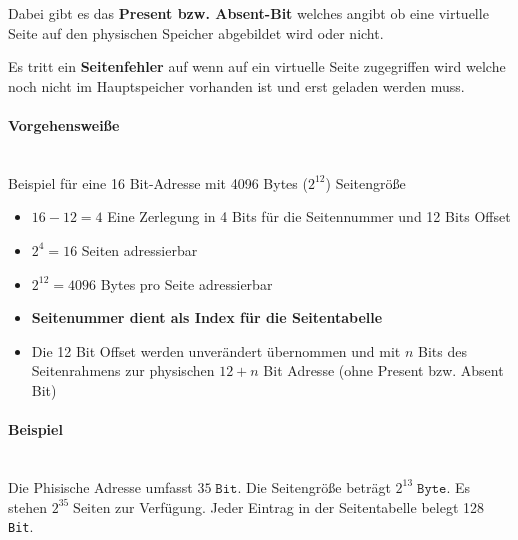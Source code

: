 \documentclass[10pt,a4paper]{article}
\begin{document}
\begin{multicols*}{4}
Dabei gibt es das \textbf{Present bzw. Absent-Bit} welches angibt ob eine virtuelle Seite auf den physischen Speicher
abgebildet wird oder nicht.

Es tritt ein \textbf{Seitenfehler} auf wenn auf ein virtuelle Seite zugegriffen wird welche noch nicht im Hauptspeicher
vorhanden ist und erst geladen werden muss.

\paragraph{Vorgehensweiße}\hfill\\
Beispiel für eine 16 Bit-Adresse mit 4096 Bytes (\(2^{12}\)) Seitengröße
\begin{itemize}
	\item \(16 - 12 = 4\) Eine Zerlegung in 4 Bits für die Seitennummer und 12 Bits Offset
	\item \(2^{4} = 16\) Seiten adressierbar
	\item \(2^{12} = 4096\) Bytes pro Seite adressierbar
	\item \textbf{Seitenummer dient als Index für die Seitentabelle}
	\item Die 12 Bit Offset werden unverändert übernommen und mit \(n\) Bits des Seitenrahmens zur physischen \(12 + n\)
	      Bit Adresse (ohne Present bzw. Absent Bit)
\end{itemize}

\paragraph{Beispiel}\hfill\\
Die Phisische Adresse umfasst \(35\;\texttt{Bit}\). Die Seitengröße beträgt \(2^{13}\;\texttt{Byte}\). Es stehen
\(2^{35}\;\text{Seiten}\) zur Verfügung. Jeder Eintrag in der Seitentabelle belegt 128 \texttt{Bit}.


\end{multicols*}
\end{document}
